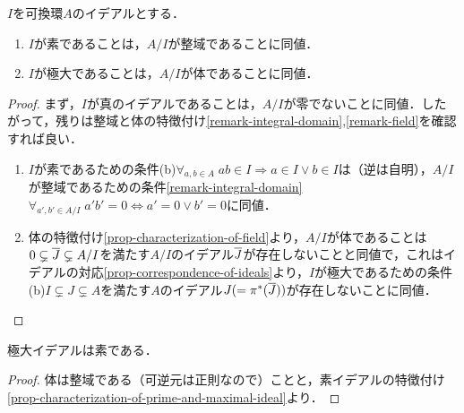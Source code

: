 \documentclass[uplatex,dvipdfmx]{jsreport}
\begin{document}
\begin{proposition}[素・極大の特徴付け]\label{prop-characterization-of-prime-and-maximal-ideal}
    $I$を可換環$A$のイデアルとする．
    \begin{enumerate}
        \item $I$が素であることは，$A/I$が整域であることに同値．
        \item $I$が極大であることは，$A/I$が体であることに同値．
    \end{enumerate}
\end{proposition}
\begin{proof}
    まず，$I$が真のイデアルであることは，$A/I$が零でないことに同値．したがって，残りは整域と体の特徴付け\ref{remark-integral-domain},\ref{remark-field}を確認すれば良い．
    \begin{enumerate}
        \item $I$が素であるための条件(b)$\forall_{a,b\in A}\;ab\in I\Rightarrow a\in I\lor b\in I$は（逆は自明），$A/I$が整域であるための条件\ref{remark-integral-domain}$\forall_{a',b'\in A/I}\;a'b'=0\Leftrightarrow a'=0\lor b'=0$に同値．
        \item 体の特徴付け\ref{prop-characterization-of-field}より，$A/I$が体であることは$0\subsetneq\overline{J}\subsetneq A/I$を満たす$A/I$のイデアル$\overline{J}$が存在しないことと同値で，これはイデアルの対応\ref{prop-correspondence-of-ideals}より，$I$が極大であるための条件(b)$I\subsetneq J\subsetneq A$を満たす$A$のイデアル$J(=\pi^*(\overline{J}))$が存在しないことに同値．
    \end{enumerate}
\end{proof}

\begin{corollary}
    極大イデアルは素である．
\end{corollary}
\begin{proof}
    体は整域である（可逆元は正則なので）ことと，素イデアルの特徴付け\ref{prop-characterization-of-prime-and-maximal-ideal}より．
\end{proof}
\end{document}
